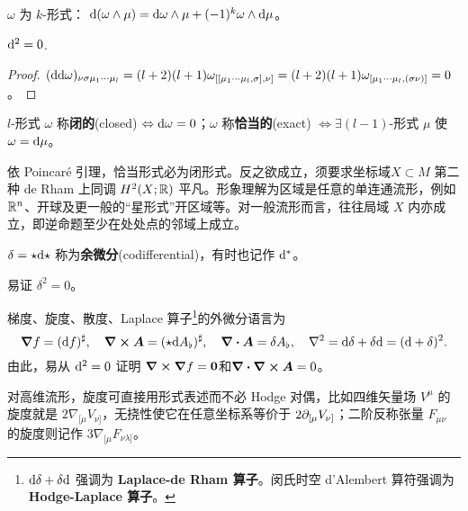 \begin{theorem}[Leibniz 律]$\omega$ 为 $k$-形式：
    $\dd(\omega\wedge\mu)=\dd\omega\wedge\mu+(-1)^k\omega\wedge\dd\mu$。
\end{theorem}

\begin{theorem}[Poincaré 引理] $\dd^2=0$.
\end{theorem}
\begin{proof} $(\dd\dd\omega)_{\nu\sigma\mu_1\cdots\mu_l}=(l+2)(l+1)\omega_{[[\mu_1\cdots\mu_l,\sigma],\nu]}=(l+2)(l+1)\omega_{[\mu_1\cdots\mu_l,(\sigma\nu)]}=0$。
\end{proof}

\begin{definition}
    $l$-形式 $\omega$ 称\textbf{闭的}(closed) $\Leftrightarrow\dd\omega=0$；$\omega$ 称\textbf{恰当的}(exact) $\Leftrightarrow \exists (l-1)$-形式 $\mu$ 使 $\omega=\dd\mu$。
\end{definition}
依 Poincaré 引理，恰当形式必为闭形式。反之欲成立，须要求坐标域$X\subset M$ 第二种 de Rham 上同调 $H^{2}(X;\mathbb{R})$ 平凡。形象理解为区域是任意的单连通流形，例如 $\mathbb{R}^{n}$、开球及更一般的“星形式”开区域等。对一般流形而言，往往局域 $X$ 内亦成立，即逆命题至少在处处点的邻域上成立。

\begin{definition}
    $\delta={\star\dd\star}$ 称为\textbf{余微分}(codifferential)，有时也记作 $\dd^*$。
\end{definition}
\begin{theorem}
    易证 $\delta^2=0$。
\end{theorem}

\begin{eg}[矢量分析]
    梯度、旋度、散度、Laplace 算子\footnote{$\dd \delta+\delta \dd$ 强调为 \textbf{Laplace-de Rham 算子}。闵氏时空 d'Alembert 算符强调为 \textbf{Hodge-Laplace 算子}。}的外微分语言为
    \[\grad f=(\dd f)^\sharp,\quad
    \curl\vb* A=({\star\dd} A_\flat)^\sharp,\quad
    \div\vb* A=\delta A_\flat,\quad
    \nabla^2=\dd \delta+\delta \dd=(\dd+\delta)^2.\]
    由此，易从 $\dd^2=0$ 证明 $\curl\grad f=\vb* 0$和$\div\curl\vb* A=0$。
    
    对高维流形，旋度可直接用形式表述而不必 Hodge 对偶，比如四维矢量场 $V^\mu$ 的旋度就是 $2\nabla_{[\mu} V_{\nu]}$，无挠性使它在任意坐标系等价于 $2\partial_{[\mu} V_{\nu]}$；二阶反称张量 $F_{\mu\nu}$ 的旋度则记作 $3\nabla_{[\mu}F_{\nu\lambda]}$。
\end{eg}

